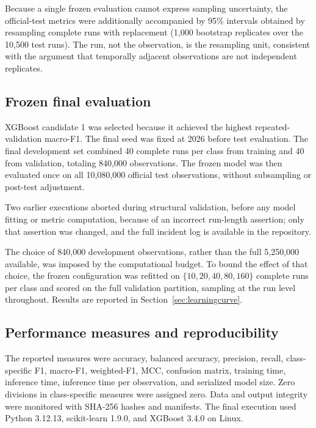 \documentclass[10pt,twocolumn,a4paper]{article}
\begin{document}
Because a single frozen evaluation cannot express sampling uncertainty, the
official-test metrics were additionally accompanied by 95\% intervals obtained
by resampling complete runs with replacement (1{,}000 bootstrap replicates over
the 10{,}500 test runs). The run, not the observation, is the resampling unit,
consistent with the argument that temporally adjacent observations are not
independent replicates.

\subsection{Frozen final evaluation}

XGBoost candidate 1 was selected because it achieved the highest repeated-
validation macro-F1. The final seed was fixed at 2026 before test evaluation.
The final development set combined 40 complete runs per class from training and
40 from validation, totaling 840,000 observations. The frozen model was then
evaluated once on all 10,080,000 official test observations, without
subsampling or post-test adjustment.

Two earlier executions aborted during structural validation, before any model
fitting or metric computation, because of an incorrect run-length assertion;
only that assertion was changed, and the full incident log is available in the
repository.

The choice of 840,000 development observations, rather than the full 5,250,000
available, was imposed by the computational budget. To bound the effect of that
choice, the frozen configuration was refitted on $\{10,20,40,80,160\}$ complete
runs per class and scored on the full validation partition, sampling at the run
level throughout. Results are reported in Section~\ref{sec:learningcurve}.

\subsection{Performance measures and reproducibility}
\label{sec:reproducibility}

The reported measures were accuracy, balanced accuracy, precision, recall,
class-specific F1, macro-F1, weighted-F1, MCC, confusion matrix, training time,
inference time, inference time per observation, and serialized model size.
Zero divisions in class-specific measures were assigned zero. Data and output
integrity were monitored with SHA-256 hashes and manifests. The final execution
used Python 3.12.13, scikit-learn 1.9.0, and XGBoost 3.4.0 on Linux.
\end{document}
